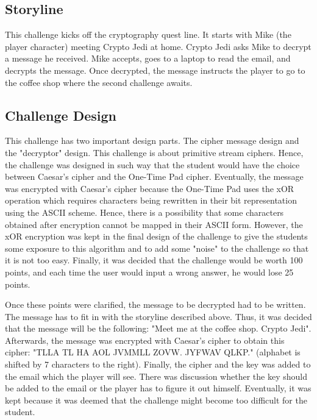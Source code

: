 \documentclass{l4proj}
\begin{document}
\subsection{Storyline}

This challenge kicks off the cryptography quest line. It starts with Mike (the player character) 
meeting Crypto Jedi at home. Crypto Jedi asks Mike to decrypt a message he received. Mike accepts, goes
to a laptop to read the email, and decrypts the message. Once decrypted, 
the message instructs the player to go to the coffee shop where the second challenge awaits.

\subsection{Challenge Design}

This challenge has two important design parts. The cipher message design and the "decryptor" design.
This challenge is about primitive stream ciphers. Hence, the challenge was designed in such way that
the student would have the choice between Caesar's cipher and the One-Time Pad cipher. Eventually,
the message was encrypted with Caesar's cipher because the One-Time Pad uses the xOR operation which requires
characters being rewritten in their bit representation using the ASCII scheme. 
Hence, there is a possibility that some characters obtained after encryption cannot be mapped in their ASCII form.
However, the xOR encryption was kept in the final design of the challenge to give the students some exposure
to this algorithm and to add some "noise" to the challenge so that it is not too easy.
Finally, it was decided that the challenge would be worth 100 points, and each time the user would input
a wrong answer, he would lose 25 points.

Once these points were clarified, the message to be decrypted had to be written. 
The message has to fit in with the storyline described above. 
Thus, it was decided that the message will be the following: "Meet me at the coffee shop. Crypto Jedi".
Afterwards, the message was encrypted with Caesar's cipher to obtain this cipher: "TLLA TL HA AOL JVMMLL ZOVW. JYFWAV QLKP."
(alphabet is shifted by 7 characters to the right). 
Finally, the cipher and the key was added to the email which the player will see.
There was discussion whether the key should be added to the email 
or the player has to figure it out himself. 
Eventually, it was kept because it was deemed that the challenge might become too difficult for the student.
\end{document}
